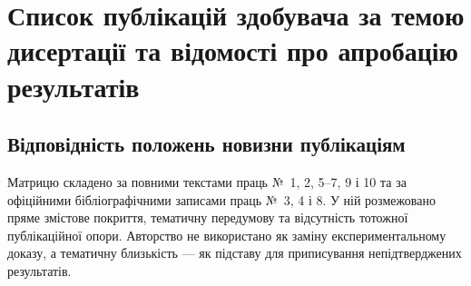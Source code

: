 \appendix
\renewcommand{\chaptername}{Додаток}
\chapter{Список публікацій здобувача за темою дисертації та відомості про апробацію результатів}
\label{app:publications_and_approbation}



\section*{Відповідність положень новизни публікаціям}
{}

Матрицю складено за повними текстами праць №~1, 2, 5--7, 9 і 10 та за офіційними бібліографічними записами праць №~3, 4 і 8. У ній розмежовано пряме змістове покриття, тематичну передумову та відсутність тотожної публікаційної опори. Авторство не використано як заміну експериментальному доказу, а тематичну близькість --- як підставу для приписування непідтверджених результатів.

